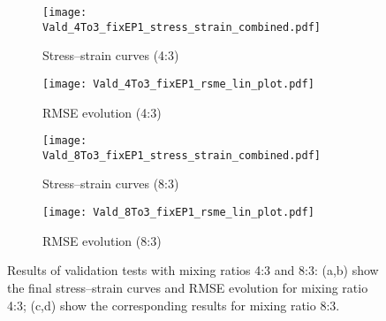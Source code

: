     \begin{figure}[H]
    \centering

    \begin{subfigure}[t]{0.495\textwidth}
        \centering
        \texttt{[image: Vald\_4To3\_fixEP1\_stress\_strain\_combined.pdf]}
        \caption{Stress–strain curves (4:3)}
        \label{fig:validation_stress_strain_4to3}
    \end{subfigure}
    \hfill
    \begin{subfigure}[t]{0.495\textwidth}
        \centering
        \texttt{[image: Vald\_4To3\_fixEP1\_rsme\_lin\_plot.pdf]}
        \caption{RMSE evolution (4:3)}
        \label{fig:validation_rmse_4to3}
    \end{subfigure}

    \vspace{1em} %

    \begin{subfigure}[t]{0.495\textwidth}
        \centering
        \texttt{[image: Vald\_8To3\_fixEP1\_stress\_strain\_combined.pdf]}
        \caption{Stress–strain curves (8:3)}
        \label{fig:validation_stress_strain_8to3}
    \end{subfigure}
    \hfill
    \begin{subfigure}[t]{0.495\textwidth}
        \centering
        \texttt{[image: Vald\_8To3\_fixEP1\_rsme\_lin\_plot.pdf]}
        \caption{RMSE evolution (8:3)}
        \label{fig:validation_rmse_8to3}
    \end{subfigure}

    \caption{Results of validation tests with mixing ratios 4:3 and 8:3:
    (a,b) show the final stress–strain curves and RMSE evolution for mixing ratio 4:3;
    (c,d) show the corresponding results for mixing ratio 8:3.}
    \label{fig:validation_results}
\end{figure}

